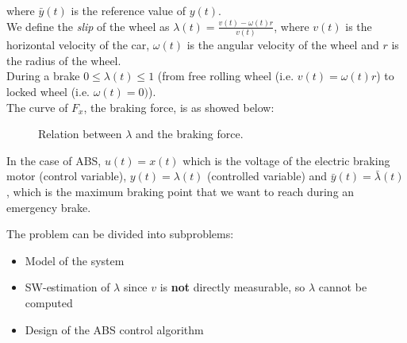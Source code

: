 where $\bar{y}(t)$ is the reference value of $y(t)$.\\

We define the \emph{slip} of the wheel as $\lambda(t) = \frac{v(t)-\omega(t) r}{v(t)}$, where $v(t)$ is the horizontal velocity of the car, $\omega(t)$ is the angular velocity of the wheel and $r$ is the radius of the wheel.\\

During a brake $0 \le \lambda (t) \le 1$ (from free rolling wheel (i.e. $v(t) = \omega (t) r$) to locked wheel (i.e. $\omega(t) = 0)$).\\
The curve of $F_{x}$, the braking force, is as showed below:
\vspace{-3cm}
\begin{figure}[h!]
    \centering
    \caption*{Relation between $\lambda$ and the braking force.}
\end{figure}


In the case of ABS, $u(t) = x(t)$ which is the voltage of the electric braking motor (control variable), $y(t) = \lambda (t)$ (controlled variable) and $\bar{y}(t) = \bar{\lambda} (t)$, which is the maximum braking point that we want to reach during an emergency brake.

The problem can be divided into subproblems:
\begin{itemize}
    \item Model of the system
    \item SW-estimation of $\lambda$ since $v$ is \textbf{not} directly measurable, so $\lambda$ cannot be computed
    \item Design of the ABS control algorithm
\end{itemize}

